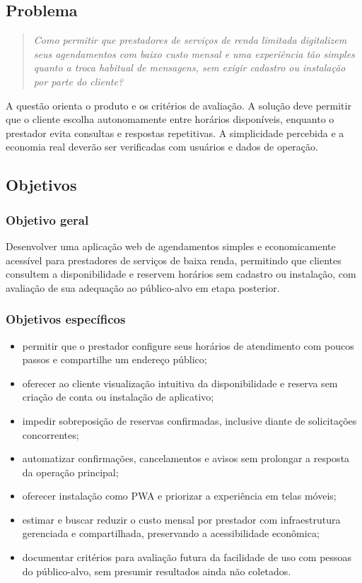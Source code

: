 \subsection{Problema}

\begin{quote}
\textit{Como permitir que prestadores de serviços de renda limitada digitalizem seus agendamentos com baixo custo mensal e uma experiência tão simples quanto a troca habitual de mensagens, sem exigir cadastro ou instalação por parte do cliente?}
\end{quote}

A questão orienta o produto e os critérios de avaliação. A solução deve permitir que o cliente escolha autonomamente entre horários disponíveis, enquanto o prestador evita consultas e respostas repetitivas. A simplicidade percebida e a economia real deverão ser verificadas com usuários e dados de operação.

\subsection{Objetivos}

\subsubsection{Objetivo geral}

Desenvolver uma aplicação web de agendamentos simples e economicamente acessível para prestadores de serviços de baixa renda, permitindo que clientes consultem a disponibilidade e reservem horários sem cadastro ou instalação, com avaliação de sua adequação ao público-alvo em etapa posterior.

\subsubsection{Objetivos específicos}

\begin{itemize}
    \item permitir que o prestador configure seus horários de atendimento com poucos passos e compartilhe um endereço público;
    \item oferecer ao cliente visualização intuitiva da disponibilidade e reserva sem criação de conta ou instalação de aplicativo;
    \item impedir sobreposição de reservas confirmadas, inclusive diante de solicitações concorrentes;
    \item automatizar confirmações, cancelamentos e avisos sem prolongar a resposta da operação principal;
    \item oferecer instalação como PWA e priorizar a experiência em telas móveis;
    \item estimar e buscar reduzir o custo mensal por prestador com infraestrutura gerenciada e compartilhada, preservando a acessibilidade econômica;
    \item documentar critérios para avaliação futura da facilidade de uso com pessoas do público-alvo, sem presumir resultados ainda não coletados.
\end{itemize}

